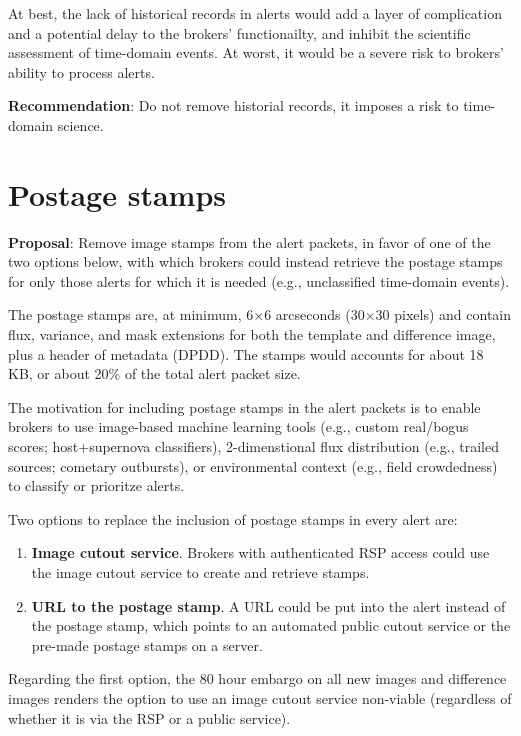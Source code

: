 \documentclass[DM,authoryear,toc]{lsstdoc}
\begin{document}
At best, the lack of historical records in alerts would add a layer of complication and a potential delay to the brokers' 
functionailty, and inhibit the scientific assessment of time-domain events.
At worst, it would be a severe risk to brokers' ability to process alerts.

\textbf{Recommendation}: Do not remove historial records, it imposes a risk to time-domain science.


\section{Postage stamps}\label{sec:stamps}

\textbf{Proposal}: Remove image stamps from the alert packets, in favor of one of the two options below, 
with which brokers could instead retrieve the postage stamps for only those alerts for which it is needed 
(e.g., unclassified time-domain events).

The postage stamps are, at minimum, 6$\times$6 arcseconds (30$\times$30 pixels) and contain flux, variance, 
and mask extensions for both the template and difference image, plus a header of metadata (DPDD).
The stamps would accounts for about 18 KB, or about 20\% of the total alert packet size.

The motivation for including postage stamps in the alert packets is to enable brokers to use image-based 
machine learning tools (e.g., custom real/bogus scores; host+supernova classifiers), 2-dimenstional flux distribution 
(e.g., trailed sources; cometary outbursts), or environmental context (e.g., field crowdedness) to classify or prioritze alerts.

Two options to replace the inclusion of postage stamps in every alert are:
\begin{enumerate}
\item \textbf{Image cutout service}. Brokers with authenticated RSP access could use the image cutout service to 
create and retrieve stamps.
\item \textbf{URL to the postage stamp}. A URL could be put into the alert instead of the postage stamp, which 
points to an automated public cutout service or the pre-made postage stamps on a server.
\end{enumerate}

Regarding the first option, the 80 hour embargo on all new images and difference images renders the option to use 
an image cutout service non-viable (regardless of whether it is via the RSP or a public service).
\end{document}
